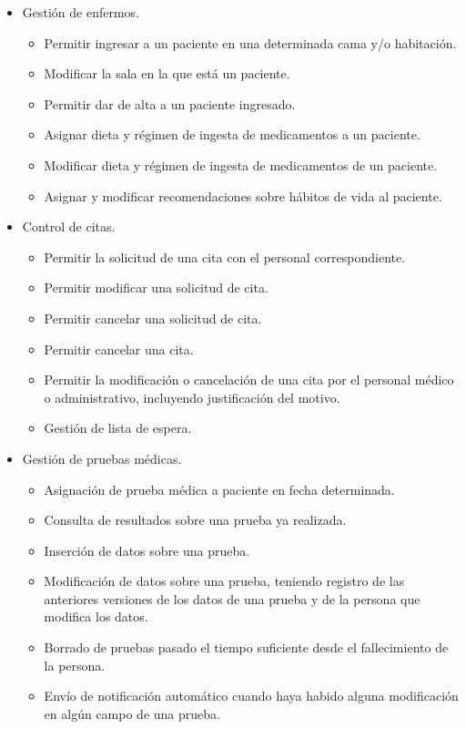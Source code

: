 \documentclass[11pt]{article}
\begin{document}
\begin{itemize}
\item Gestión de enfermos.
\begin{itemize}
\item Permitir ingresar a un paciente en una determinada cama y/o habitación.
\item Modificar la sala en la que está un paciente.
\item Permitir dar de alta a un paciente ingresado.
\item Asignar dieta y régimen de ingesta de medicamentos a un paciente.
\item Modificar dieta y régimen de ingesta de medicamentos de un paciente.
\item Asignar y modificar recomendaciones sobre hábitos de vida al paciente.
\end{itemize}

\item Control de citas.
\begin{itemize}
\item Permitir la solicitud de una cita con el personal correspondiente.
\item Permitir modificar una solicitud de cita.
\item Permitir cancelar una solicitud de cita.
\item Permitir cancelar una cita.
\item Permitir la modificación o cancelación de una cita por el personal médico o administrativo, incluyendo justificación del motivo.
\item Gestión de lista de espera.
\end{itemize}

\item Gestión de pruebas médicas.
\begin{itemize}
\item Asignación de prueba médica a paciente en fecha determinada.
\item Consulta de resultados sobre una prueba ya realizada.
\item Inserción de datos sobre una prueba.
\item Modificación de datos sobre una prueba, teniendo registro de las anteriores versiones de los datos de una prueba y de la persona que modifica los datos.
\item Borrado de pruebas pasado el tiempo suficiente desde el fallecimiento de la persona.
\item Envío de notificación automático cuando haya habido alguna modificación en algún campo de una prueba.
\end{itemize}


\end{itemize}
\end{document}
